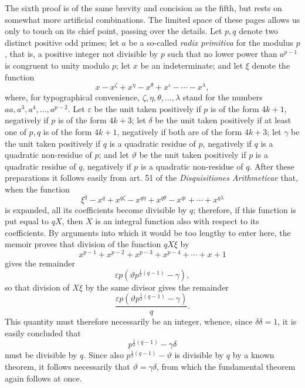 \documentclass[12pt]{article}
\begin{document}
The sixth proof is of the same brevity and concision as the fifth, but rests on somewhat more artificial combinations. The limited space of these pages allows us only to touch on its chief point, passing over the details. Let $p,q$ denote two distinct positive odd primes; let $a$ be a so-called \textit{radix primitiva} for the modulus $p$, that is, a positive integer not divisible by $p$ such that no lower power than $a^{p-1}$ is congruent to unity modulo $p$; let $x$ be an indeterminate; and let $\xi$ denote the function
\[
x-x^\zeta+x^\eta-x^\theta+x^\iota-\cdots-x^\lambda,
\]
where, for typographical convenience, $\zeta,\eta,\theta,
\ldots,\lambda$ stand for the numbers $aa,a^3,a^4,\ldots,a^{p-2}$. Let $\varepsilon$ be the unit taken positively if $p$ is of the form $4k+1$, negatively if $p$ is of the form $4k+3$; let $\delta$ be the unit taken positively if at least one of $p,q$ is of the form $4k+1$, negatively if both are of the form $4k+3$; let $\gamma$ be the unit taken positively if $q$ is a quadratic residue of $p$, negatively if $q$ is a quadratic non-residue of $p$; and let $\vartheta$ be the unit taken positively if $p$ is a quadratic residue of $q$, negatively if $p$ is a quadratic non-residue of $q$. After these preparations it follows easily from art. 51 of the \textit{Disquisitiones Arithmeticae} that, when the function
\[
\xi^q-x^q+x^{q\zeta}-x^{q\eta}+x^{q\theta}-x^{q\iota}+\cdots+x^{q\lambda}
\]
is expanded, all its coefficients become divisible by $q$; therefore, if this function is put equal to $qX$, then $X$ is an integral function also with respect to its coefficients. By arguments into which it would be too lengthy to enter here, the memoir proves that division of the function $qX\xi$ by
\[
x^{p-1}+x^{p-2}+x^{p-3}+x^{p-4}+\cdots+x+1
\]
gives the remainder
\[
\varepsilon p(\vartheta p^{\frac12(q-1)}-\gamma),
\]
so that division of $X\xi$ by the same divisor gives the remainder
\[
\frac{\varepsilon p(\vartheta p^{\frac12(q-1)}-\gamma)}{q}.
\]
This quantity must therefore necessarily be an integer, whence, since $\delta\delta=1$, it is easily concluded that
\[
p^{\frac12(q-1)}-\gamma\delta
\]
must be divisible by $q$. Since also $p^{\frac12(q-1)}-\vartheta$ is divisible by $q$ by a known theorem, it follows necessarily that $\vartheta=\gamma\delta$, from which the fundamental theorem again follows at once.
\end{document}
